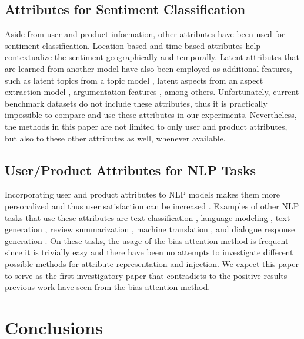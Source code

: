 \documentclass[11pt,a4paper]{article}
\begin{document}
\subsection{Attributes for Sentiment Classification}

Aside from user and product information, other attributes have been used for sentiment classification. Location-based \cite{yang2017identifying} and time-based \cite{fukuhara2007understanding} attributes help contextualize the sentiment geographically and temporally. Latent attributes that are learned from another model have also been employed as additional features, such as latent topics from a topic model \cite{lin2009joint}, latent aspects from an aspect extraction model \cite{jo2011aspect}, argumentation features  \cite{wachsmuth2015sentiment}, among others. Unfortunately, current benchmark datasets do not include these attributes, thus it is practically impossible to compare and use these attributes in our experiments.
Nevertheless, the methods in this paper are not limited to only user and product attributes, but also to these other attributes as well, whenever available.

\subsection{User/Product Attributes for NLP Tasks}

Incorporating user and product attributes to NLP models makes them more personalized and thus user satisfaction can be increased \cite{baruzzo2009general}. Examples of other NLP tasks that use these attributes are text classification \cite{kim2019categorical}, language modeling \cite{jaech2018low}, text generation \cite{dong2017learning,ni2018personalized}, review summarization \cite{yang2018personalized}, machine translation \cite{michel2018extreme}, and dialogue response generation \cite{zhang2017neural}. On these tasks, the usage of the bias-attention method is frequent since it is trivially easy and there have been no attempts to investigate different possible methods for attribute representation and injection. We expect this paper to serve as the first investigatory paper that contradicts to the positive results previous work have seen from the bias-attention method.

\section{Conclusions}
\end{document}
